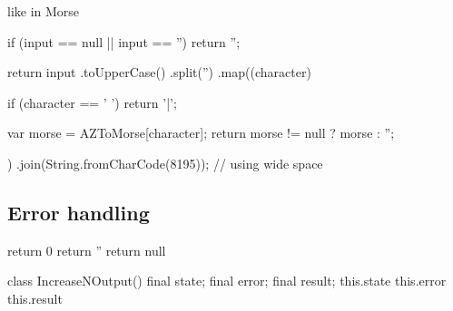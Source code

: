 like in Morse

  if (input == null || input == '')
    return '';

  return input
         .toUpperCase()
         .split('')
         .map((character) {
            if (character == ' ')
              return '|';
    
            var morse = AZToMorse[character];
            return morse != null ? morse : '';
          })
         .join(String.fromCharCode(8195)); // using wide space


\subsection{Error handling}
return 0
return ''
return null

class IncreaseNOutput(){
final state;
final error;
final result;
}
this.state  this.error   this.result
